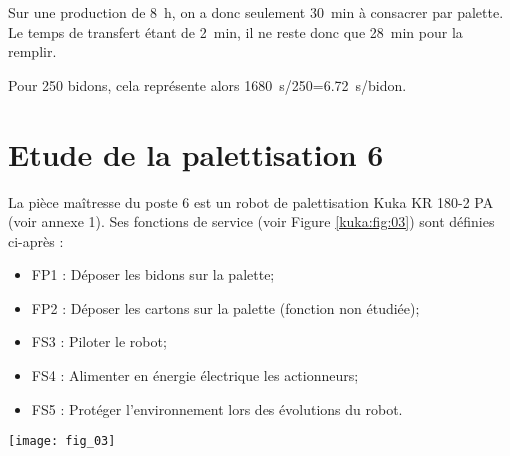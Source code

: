 \ifprof
\begin{corrige}
Sur une production de \SI{8}{h}, on a donc seulement \SI{30}{min} à consacrer par palette. 
Le temps de transfert étant de \SI{2}{min}, il ne reste donc que \SI{28}{min} pour la remplir.
\end{corrige}
\else
\fi

\ifprof
\begin{corrige}
Pour 250 bidons, cela représente alors \SI{1680}{s}/250=\SI{6,72}{s/bidon}.
\end{corrige}
\else
\fi


\section{Etude de la palettisation 6}

\ifprof
\else

\vspace{.4cm}
\noindent\begin{minipage}[c]{.53\linewidth}
La pièce maîtresse du poste 6 est un robot de palettisation Kuka KR 180-2 PA (voir annexe 1). Ses fonctions de service (voir Figure \ref{kuka:fig:03}) sont définies ci-après : 
\begin{itemize}
\item FP1 : Déposer les bidons sur la palette;
\item FP2 : Déposer les cartons sur la palette (fonction non étudiée);
\item FS3 : Piloter le robot;
\item FS4 : Alimenter en énergie électrique les actionneurs;
\item FS5 : Protéger l’environnement lors des évolutions du robot.
\end{itemize}

\end{minipage} \hfill
\begin{minipage}[c]{.45\linewidth}
\begin{center}
\texttt{[image: fig\_03]}
\end{center}
\end{minipage}

